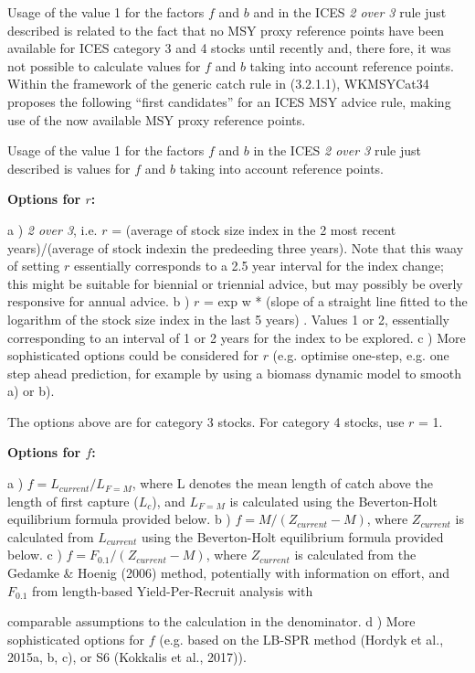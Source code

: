 Usage of the value 1 for the factors $f$ and $b$ and  in the ICES \textit{2 over 3} rule just described is related  to  the  fact  that  no  MSY  proxy  reference  points  have  been  available  for  ICES  
category  3  and  4  stocks  until  recently  and,  there fore,  it  was  not  possible  to  calculate values for $f$ and $b$  taking into account reference points. Within the framework of the generic catch rule in (3.2.1.1), WKMSYCat34 proposes the following “first candidates” for an ICES MSY advice rule, making use of the now available MSY proxy reference points.

  
Usage of the value 1 for the factors $f$ and $b$ in the ICES \textit{2 over 3} rule just described is values for $f$ and $b$ taking into account reference points.

\textbf{Options for $r$:}

a )  \textit{2 over 3}, i.e. $r$ = (average of stock size index in the 2 most recent years)/(average of stock indexin the predeeding three years). Note that this waay of setting $r$ essentially corresponds to a 2.5 year interval for the index change; this might be suitable for biennial or triennial advice, but may possibly be overly responsive for annual advice.
b ) $r$ = exp{ w * (slope of a straight line fitted to the logarithm of the stock size index in the last 5 years) }. Values 1 or 2, essentially corresponding to an interval of 1 or 2 years for the index to be explored.
c )  More sophisticated options could be considered for $r$ (e.g. optimise one-step, e.g. one step ahead prediction, for example by using a biomass dynamic model to smooth a) or b).

The options above are for category 3 stocks. For category 4 stocks, use $r$ = 1. 



\textbf{Options for $f$:} 

a ) $f = L_{current}/L_{F=M}$, where L denotes the mean length of catch above the length of first capture ($L_c$), and $L_{F=M}$ is calculated using the Beverton-Holt equilibrium formula provided below.
b ) $f = M/(Z_{current}-M)$, 
where $Z_{current}$ is calculated from $L_{current}$ using the Beverton-Holt equilibrium formula provided below.
c ) $f = F_{0.1}/(Z_{current}-M)$, where $Z_{current}$ is calculated from the Gedamke \& Hoenig (2006) method, potentially with information on effort, and $F_{0.1}$ from length-based Yield-Per-Recruit analysis with 

comparable assumptions to the calculation in the denominator.  
d )  More sophisticated options for $f$ (e.g. based on the LB-SPR method (Hordyk et al., 2015a, b, c), or S6 (Kokkalis et al., 2017)). 

